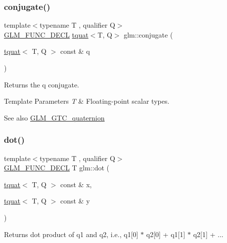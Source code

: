 \subsubsection{\texorpdfstring{conjugate()}{conjugate()}}
{\footnotesize\ttfamily template$<$typename T , qualifier Q$>$ \\
\mbox{\hyperlink{setup_8hpp_ab2d052de21a70539923e9bcbf6e83a51}{G\+L\+M\+\_\+\+F\+U\+N\+C\+\_\+\+D\+E\+CL}} \mbox{\hyperlink{structglm_1_1tquat}{tquat}}$<$T, Q$>$ glm\+::conjugate (\begin{DoxyParamCaption}\item[{\mbox{\hyperlink{structglm_1_1tquat}{tquat}}$<$ T, Q $>$ const \&}]{q }\end{DoxyParamCaption})}

Returns the q conjugate.


\begin{DoxyTemplParams}{Template Parameters}
{\em T} & Floating-\/point scalar types.\\
\hline
\end{DoxyTemplParams}
\begin{DoxySeeAlso}{See also}
\mbox{\hyperlink{group__gtc__quaternion}{G\+L\+M\+\_\+\+G\+T\+C\+\_\+quaternion}} 
\end{DoxySeeAlso}
\mbox{\label{group__gtc__quaternion_gab219911644fdc694e7d275cfcf35bfca}} 
\subsubsection{\texorpdfstring{dot()}{dot()}}
{\footnotesize\ttfamily template$<$typename T , qualifier Q$>$ \\
\mbox{\hyperlink{setup_8hpp_ab2d052de21a70539923e9bcbf6e83a51}{G\+L\+M\+\_\+\+F\+U\+N\+C\+\_\+\+D\+E\+CL}} T glm\+::dot (\begin{DoxyParamCaption}\item[{\mbox{\hyperlink{structglm_1_1tquat}{tquat}}$<$ T, Q $>$ const \&}]{x,  }\item[{\mbox{\hyperlink{structglm_1_1tquat}{tquat}}$<$ T, Q $>$ const \&}]{y }\end{DoxyParamCaption})}

Returns dot product of q1 and q2, i.\+e., q1\mbox{[}0\mbox{]} $\ast$ q2\mbox{[}0\mbox{]} + q1\mbox{[}1\mbox{]} $\ast$ q2\mbox{[}1\mbox{]} + ...


